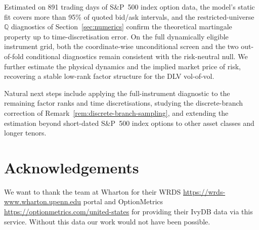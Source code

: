 \documentclass[11pt]{article}
\newcommand{\Q}{\mathbb Q}
\theoremstyle{plain}
\theoremstyle{definition}
\theoremstyle{remark}
\begin{document}
Estimated on 891 trading days of S\&P~500 index option data, the model's static fit covers more
than 95\% of quoted bid/ask intervals, and the restricted-universe $\Q$ diagnostics of
Section~\ref{sec:numerics} confirm the theoretical martingale property up to time-discretisation
error.  On the full dynamically eligible instrument grid, both the
coordinate-wise unconditional screen and the two out-of-fold conditional
diagnostics remain consistent with the risk-neutral null.  We
further estimate the physical dynamics and the implied market price of risk, recovering a
stable low-rank factor structure for the DLV vol-of-vol.

Natural next steps include applying the full-instrument diagnostic to the
remaining factor ranks and time discretisations, studying the discrete-branch
correction of Remark~\ref{rem:discrete-branch-sampling}, and extending
the estimation beyond short-dated S\&P~500 index options to other asset classes and longer
tenors.

\section{Acknowledgements}

We want to thank the team at Wharton for their WRDS \url{https://wrds-www.wharton.upenn.edu} portal and OptionMetrics \url{https://optionmetrics.com/united-states} 
for providing their IvyDB data via this service. Without this data our work would not have been possible.


\appendix





\end{document}
